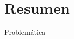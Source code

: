 \documentclass[
	12pt, %
	aspectratio=169, %
]{beamer}
\begin{document}


\section{Resumen}

\begin{frame}{Problemática}



\end{frame}
\end{document}
